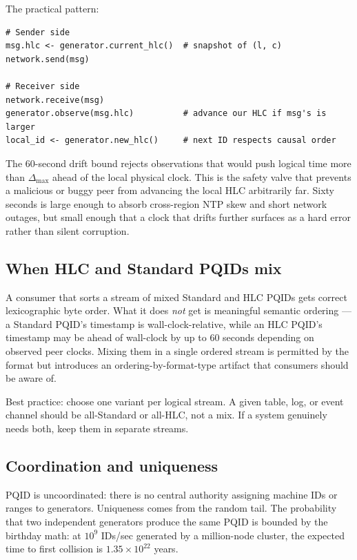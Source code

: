 The practical pattern:

\begin{lstlisting}[language=Pseudocode,caption={Plumbing HLC observation through a message-passing layer},label={lst:hlc-plumbing}]
# Sender side
msg.hlc <- generator.current_hlc()  # snapshot of (l, c)
network.send(msg)

# Receiver side
network.receive(msg)
generator.observe(msg.hlc)          # advance our HLC if msg's is larger
local_id <- generator.new_hlc()     # next ID respects causal order
\end{lstlisting}

The 60-second drift bound rejects observations that would push logical time more than $\Delta_{\max}$ ahead of the local physical clock. This is the safety valve that prevents a malicious or buggy peer from advancing the local HLC arbitrarily far. Sixty seconds is large enough to absorb cross-region NTP skew and short network outages, but small enough that a clock that drifts further surfaces as a hard error rather than silent corruption.

\subsection{When HLC and Standard PQIDs mix}

A consumer that sorts a stream of mixed Standard and HLC PQIDs gets correct lexicographic byte order. What it does \emph{not} get is meaningful semantic ordering --- a Standard PQID's timestamp is wall-clock-relative, while an HLC PQID's timestamp may be ahead of wall-clock by up to 60 seconds depending on observed peer clocks. Mixing them in a single ordered stream is permitted by the format but introduces an ordering-by-format-type artifact that consumers should be aware of.

Best practice: choose one variant per logical stream. A given table, log, or event channel should be all-Standard or all-HLC, not a mix. If a system genuinely needs both, keep them in separate streams.

\subsection{Coordination and uniqueness}

PQID is uncoordinated: there is no central authority assigning machine IDs or ranges to generators. Uniqueness comes from the random tail. The probability that two independent generators produce the same PQID is bounded by the birthday math: at $10^9$ IDs/sec generated by a million-node cluster, the expected time to first collision is $1.35 \times 10^{22}$ years.

